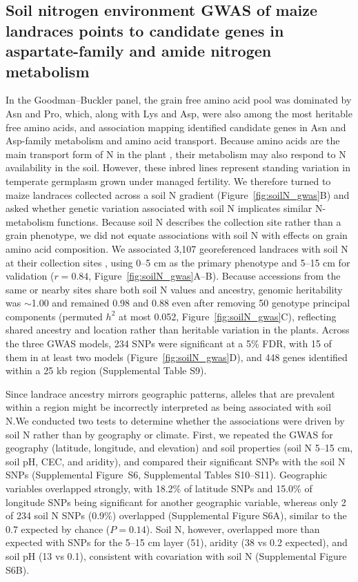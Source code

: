 \documentclass[namedate,unnumsec,webpdf,contemporary,large]{oup-authoring-template}
\begin{document}
\subsection{Soil nitrogen environment GWAS of maize landraces points to candidate genes in aspartate-family and amide nitrogen metabolism}

In the Goodman--Buckler panel, the grain free amino acid pool was dominated by Asn and Pro, which, along with Lys and Asp, were also among the most heritable free amino acids, and association mapping identified candidate genes in Asn and Asp-family metabolism and amino acid transport. Because amino acids are the main transport form of N in the plant \citep{MasclauxDaubresse2010NUE}, their metabolism may also respond to N availability in the soil. However, these inbred lines represent standing variation in temperate germplasm grown under managed fertility. We therefore turned to maize landraces collected across a soil N gradient (Figure~\ref{fig:soilN_gwas}B) and asked whether genetic variation associated with soil N implicates similar N-metabolism functions. Because soil N describes the collection site rather than a grain phenotype, we did not equate associations with soil N with effects on grain amino acid composition. We associated 3,107 georeferenced landraces \citep{RomeroNavarro2017Landraces} with soil N at their collection sites \citep{Poggio2021SoilGrids}, using 0--5 cm as the primary phenotype and 5--15 cm for validation ($r = 0.84$, Figure~\ref{fig:soilN_gwas}A--B). Because accessions from the same or nearby sites share both soil N values and ancestry, genomic heritability was $\sim$1.00 and remained 0.98 and 0.88 even after removing 50 genotype principal components (permuted $h^2$ at most 0.052, Figure~\ref{fig:soilN_gwas}C), reflecting shared ancestry and location rather than heritable variation in the plants. Across the three GWAS models, 234 SNPs were significant at a 5\% FDR, with 15 of them in at least two models (Figure~\ref{fig:soilN_gwas}D), and 448 genes identified within a 25 kb region (Supplemental Table S9).

Since landrace ancestry mirrors geographic patterns, alleles that are prevalent within a region might be incorrectly interpreted as being associated with soil N.We conducted two tests to determine whether the associations were driven by soil N rather than by geography or climate. First, we repeated the GWAS for geography (latitude, longitude, and elevation) and soil properties (soil N 5--15 cm, soil pH, CEC, and aridity), and compared their significant SNPs with the soil N SNPs (Supplemental Figure~S6, Supplemental Tables S10--S11). Geographic variables overlapped strongly, with 18.2\% of latitude SNPs and 15.0\% of longitude SNPs being significant for another geographic variable, whereas only 2 of 234 soil N SNPs (0.9\%) overlapped (Supplemental Figure S6A), similar to the 0.7 expected by chance ($P = 0.14$). Soil N, however, overlapped more than expected with SNPs for the 5--15 cm layer (51), aridity (38 vs 0.2 expected), and soil pH (13 vs 0.1), consistent with covariation with soil N (Supplemental Figure S6B).
\end{document}
